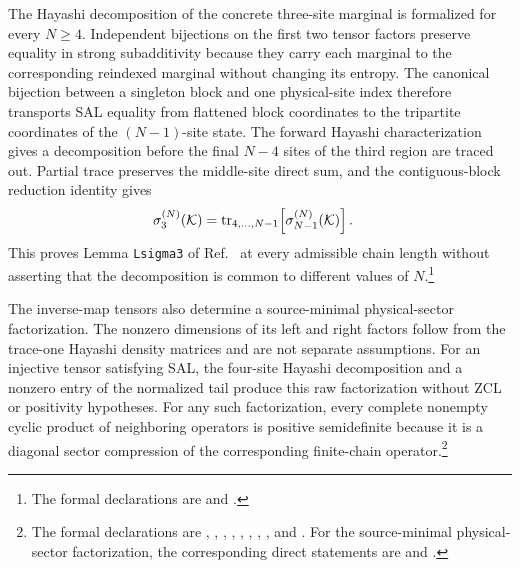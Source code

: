 \documentclass{article}
\begin{document}
The Hayashi decomposition of the concrete three-site marginal is formalized
for every $N\geq 4$. Independent bijections on the first two tensor factors
preserve equality in strong subadditivity because they carry each marginal to
the corresponding reindexed marginal without changing its entropy. The
canonical bijection between a singleton block and one physical-site index
therefore transports SAL equality from flattened block coordinates to the
tripartite coordinates of the $(N-1)$-site state. The forward Hayashi
characterization gives a decomposition before the final $N-4$ sites of the
third region are traced out. Partial trace preserves the middle-site direct
sum, and the contiguous-block reduction identity gives
\begin{align}
    \sigma_3^{(N)}(\mathcal K)
        &=
        \operatorname{tr}_{4,\ldots,N-1}\!\left[\sigma_{N-1}^{(N)}(\mathcal K)\right].
    \label{eq:cpgsv17_mpdo_sal_zcl_eta_local_structure_three_site_reduction}
\end{align}
This proves Lemma \texttt{Lsigma3} of Ref.~\cite{Cirac2016MPDO_arXiv} at every
admissible chain length without asserting that the decomposition is common to
different values of $N$.\footnote{The formal declarations are
 and
.}

The inverse-map tensors also determine a source-minimal physical-sector
factorization. The nonzero dimensions of its left and right factors follow
from the trace-one Hayashi density matrices and are not separate assumptions.
For an injective tensor satisfying SAL, the four-site Hayashi decomposition
and a nonzero entry of the normalized tail produce this raw factorization
without ZCL or positivity hypotheses. For any such factorization, every
complete nonempty cyclic product of neighboring operators is positive
semidefinite because it is a diagonal sector compression of the corresponding
finite-chain operator.\footnote{The formal declarations are
,
,
,
,
,
,
,
, and
.
For the source-minimal physical-sector factorization, the corresponding direct
statements are
and
.}
\end{document}
